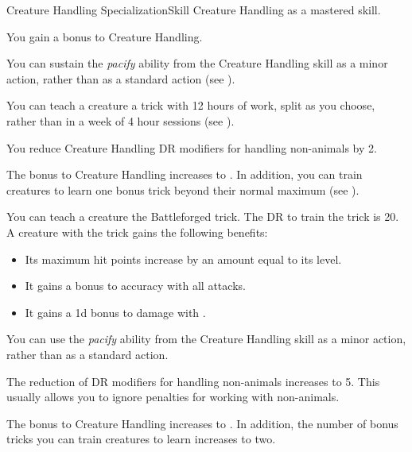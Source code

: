     \begin{feat}{Creature Handling Specialization}{Skill}
        \featpre Creature Handling as a mastered skill.
        \featben

         You gain a  bonus to Creature Handling.

         You can sustain the \textit{pacify} ability from the Creature Handling skill as a minor action, rather than as a standard action (see ).

         You can teach a creature a trick with 12 hours of work, split as you choose, rather than in a week of 4 hour sessions (see ).

         You reduce Creature Handling DR modifiers for handling non-animals by 2.

         The bonus to Creature Handling increases to .
        In addition, you can train creatures to learn one bonus trick beyond their normal maximum (see ).

         You can teach a creature the Battleforged trick.
        The DR to train the trick is 20.
        A creature with the trick gains the following benefits:
        \begin{itemize}
            \item Its maximum hit points increase by an amount equal to its level.
            \item It gains a  bonus to accuracy with all attacks.
            \item It gains a \plus1d bonus to damage with .
        \end{itemize}

         You can use the \textit{pacify} ability from the Creature Handling skill as a minor action, rather than as a standard action.

         The reduction of DR modifiers for handling non-animals increases to 5.
        This usually allows you to ignore penalties for working with non-animals.

         The bonus to Creature Handling increases to .
        In addition, the number of bonus tricks you can train creatures to learn increases to two.


\end{feat}
